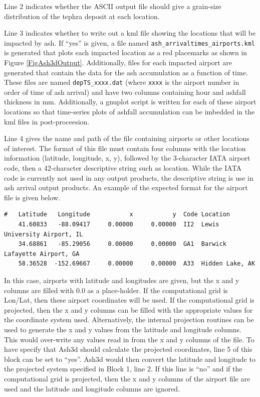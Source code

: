 Line 2 indicates whether the ASCII output file should give a grain-size distribution
of the tephra deposit at each location.

Line 3 indicates whether to write out a kml file showing the locations that will be
impacted by ash. If ``yes'' is given, a file named
\texttt{ash\_arrivaltimes\_airports.kml} is generated
that plots each impacted location as a red placemarks as shown in
Figure \ref{FigAsh3dOutput}.
Additionally, files for each impacted airport are generated that contain the data
for the ash accumulation as a function of time.  These files are named
\texttt{depTS\_xxxx.dat} (where \texttt{xxxx} is the airport number in order of
time of ash arrival) and have two columns containing hour and ashfall thickness
in $\mathrm{mm}$.  Additionally, a gnuplot script is written for each of these
airport locations so that time-series plots of ashfall accumulation can be imbedded
in the kml files in post-proceesion.

Line 4 gives the name and path of the file containing airports or other locations
of interest.  The format of this file must contain four columns with the location
information (latitude, longitude, x, y), followed by the 3-character IATA airport
code, then a 42-character descriptive string such as location.  While the IATA
code is currently not used in any output products, the descriptive
string is use in ash arrival output products.  An example of the expected format
for the airport file is given below.
\small
\begin{verbatim}
#   Latitude   Longitude           x           y  Code Location
    41.60833   -88.09417     0.00000     0.00000  II2  Lewis University Airport, IL
    34.68861   -85.29056     0.00000     0.00000  GA1  Barwick Lafayette Airport, GA
    58.36528  -152.69667     0.00000     0.00000  A33  Hidden Lake, AK
\end{verbatim}
\normalsize
In this case, airports with latitude and longitudes are given, but the x and y
columns are filled with 0.0 as a place-holder.  If the computational grid is
Lon/Lat, then these airport coordinates will be used.  If the computational 
grid is projected, then the x and y columns can be filled with the appropriate
values for the coordinate system used.  Alternatively, the internal projection routines
can be used to generate the x and y values from the latitude and longitude columns.
This would over-write any values read in from the x and y columns of the file.
To have specify that Ash3d should calculate the projected coordinates, line 5 of
this block can be set to ``yes''.  Ash3d would then convert the latitude and longitude
to the projected system specified in Block 1, line 2.  If this line is ``no'' and 
if the computational grid is projected, then the x and y columns of the airport
file are used and the latitude and longitude columns are ignored.  

